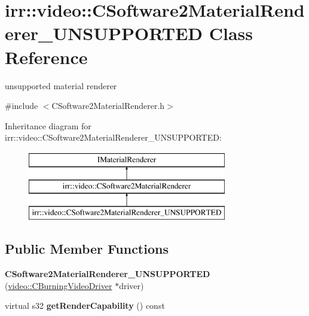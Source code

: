 \hypertarget{classirr_1_1video_1_1_c_software2_material_renderer___u_n_s_u_p_p_o_r_t_e_d}{\section{irr\-:\-:video\-:\-:C\-Software2\-Material\-Renderer\-\_\-\-U\-N\-S\-U\-P\-P\-O\-R\-T\-E\-D Class Reference}
\label{classirr_1_1video_1_1_c_software2_material_renderer___u_n_s_u_p_p_o_r_t_e_d}
}


unsupported material renderer  




{\ttfamily \#include $<$C\-Software2\-Material\-Renderer.\-h$>$}

Inheritance diagram for irr\-:\-:video\-:\-:C\-Software2\-Material\-Renderer\-\_\-\-U\-N\-S\-U\-P\-P\-O\-R\-T\-E\-D\-:\begin{figure}[H]
\begin{center}
\leavevmode
\includegraphics[height=3.000000cm]{classirr_1_1video_1_1_c_software2_material_renderer___u_n_s_u_p_p_o_r_t_e_d}
\end{center}
\end{figure}
\subsection*{Public Member Functions}
\begin{DoxyCompactItemize}
\item 
\hypertarget{classirr_1_1video_1_1_c_software2_material_renderer___u_n_s_u_p_p_o_r_t_e_d_a9393a0ffd967efe9f6a639bd7a1ac562}{{\bfseries C\-Software2\-Material\-Renderer\-\_\-\-U\-N\-S\-U\-P\-P\-O\-R\-T\-E\-D} (\hyperlink{classirr_1_1video_1_1_c_burning_video_driver}{video\-::\-C\-Burning\-Video\-Driver} $\ast$driver)}\label{classirr_1_1video_1_1_c_software2_material_renderer___u_n_s_u_p_p_o_r_t_e_d_a9393a0ffd967efe9f6a639bd7a1ac562}

\item 
\hypertarget{classirr_1_1video_1_1_c_software2_material_renderer___u_n_s_u_p_p_o_r_t_e_d_aa85821a1423973a3e5a5ce0a48a05f43}{virtual s32 {\bfseries get\-Render\-Capability} () const }\label{classirr_1_1video_1_1_c_software2_material_renderer___u_n_s_u_p_p_o_r_t_e_d_aa85821a1423973a3e5a5ce0a48a05f43}

\end{DoxyCompactItemize}
